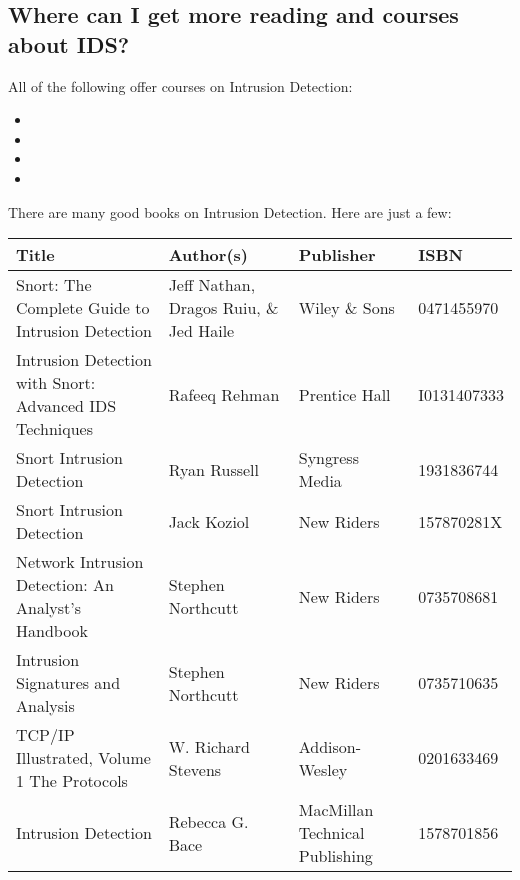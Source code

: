 \documentclass{article}
\begin{document}
\subsection{Where can I get more reading and courses about IDS?\label{courses}}

All of the following offer courses on Intrusion Detection:
\begin{itemize}
\item {} 
\item {} 
\item {}
\item {} 
\end{itemize}

There are many good books on Intrusion Detection. Here are just a few:

\begin{tabular}{|p{2in}|p{1.5in}|l|l|}
\hline
{\bf Title} & {\bf Author(s)} & {\bf Publisher} & {\bf ISBN}\\
\hline\hline
Snort: The Complete Guide to Intrusion Detection & Jeff Nathan, Dragos Ruiu, \& Jed Haile & Wiley \& Sons &  0471455970 \\
\hline
Intrusion Detection with Snort: Advanced IDS Techniques & Rafeeq Rehman & Prentice Hall & I0131407333\\
\hline
Snort Intrusion Detection        &       Ryan Russell        & Syngress Media &  1931836744 \\
\hline
Snort Intrusion Detection        &        Jack Koziol        &   New Riders   &  157870281X\\
\hline
Network Intrusion Detection: An Analyst's Handbook & Stephen Northcutt & New Riders & 0735708681 \\
\hline
Intrusion Signatures and Analysis                 & Stephen Northcutt & New Riders & 0735710635 \\
\hline
TCP/IP Illustrated, Volume 1 The Protocols        & W. Richard Stevens & Addison-Wesley & 0201633469 \\
\hline
Intrusion Detection                               & Rebecca G. Bace    & MacMillan Technical Publishing & 1578701856 \\
\hline
\end{tabular}
\end{document}
